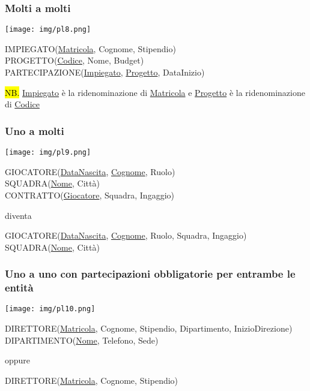 \documentclass[a4paper]{article}
\begin{document}
\subsubsection{Molti a molti}
\begin{center}
      \texttt{[image: img/pl8.png]}
\end{center}\par IMPIEGATO(\underline{Matricola}, Cognome, Stipendio)\\
PROGETTO(\underline{Codice}, Nome, Budget)\\
PARTECIPAZIONE(\underline{Impiegato}, \underline{Progetto}, DataInizio)\medskip\\\par \hl{NB.} \underline{Impiegato} è la ridenominazione di \underline{Matricola} e \underline{Progetto} è la ridenominazione di \underline{Codice}\par \subsubsection{Uno a molti}
\begin{center}
      \texttt{[image: img/pl9.png]}
\end{center}\par GIOCATORE(\underline{DataNascita}, \underline{Cognome}, Ruolo)\\
SQUADRA(\underline{Nome}, Città)\\
CONTRATTO(\underline{Giocatore}, Squadra, Ingaggio)\medskip\\\par diventa\medskip\\\par GIOCATORE(\underline{DataNascita}, \underline{Cognome}, Ruolo, Squadra, Ingaggio)\\
SQUADRA(\underline{Nome}, Città)\par \subsubsection{Uno a uno con partecipazioni obbligatorie per entrambe le entità}
\begin{center}
      \texttt{[image: img/pl10.png]}
\end{center}\par DIRETTORE(\underline{Matricola}, Cognome, Stipendio, Dipartimento, InizioDirezione)\\
DIPARTIMENTO(\underline{Nome}, Telefono, Sede)\medskip\\\par oppure\medskip\\\par DIRETTORE(\underline{Matricola}, Cognome, Stipendio)\\
\end{document}
